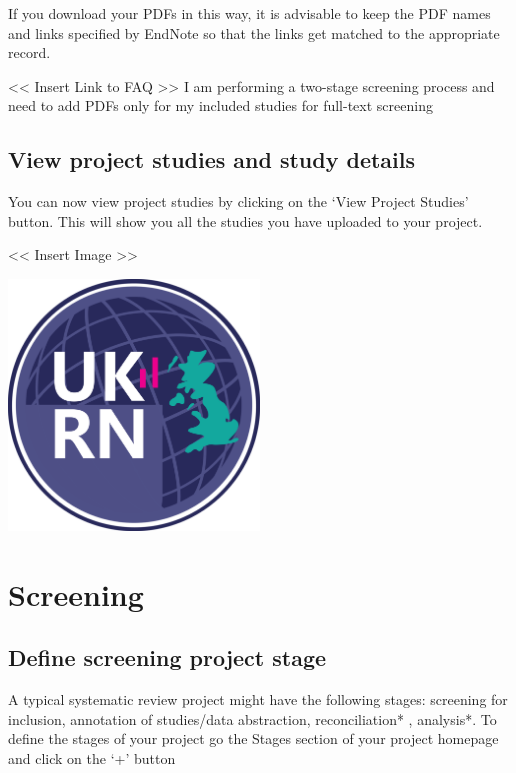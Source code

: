 \documentclass[]{book}
\begin{document}
If you download your PDFs in this way, it is advisable to keep the PDF
names and links specified by EndNote so that the links get matched to
the appropriate record.

\textless{}\textless{} Insert Link to FAQ \textgreater{}\textgreater{} I
am performing a two-stage screening process and need to add PDFs only
for my included studies for full-text screening

\section{View project studies and study
details}\label{view-project-studies-and-study-details}

You can now view project studies by clicking on the `View Project
Studies' button. This will show you all the studies you have uploaded to
your project.

\textless{}\textless{} Insert Image \textgreater{}\textgreater{}

\includegraphics[width=0.50000\textwidth,height=0.50000\textwidth]{figs/evidence-triangle.png}

\chapter{Screening}\label{screening}

\section{Define screening project
stage}\label{define-screening-project-stage}

A typical systematic review project might have the following stages:
screening for inclusion, annotation of studies/data abstraction,
reconciliation* , analysis*. To define the stages of your project go the
Stages section of your project homepage and click on the `+' button
\end{document}
